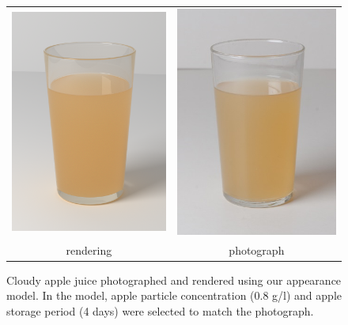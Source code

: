 \begin{figure}
\begin{tabular}{@{}c@{}c@{}}
	 \includegraphics[width=0.5\columnwidth]{figures/teaser_render.png} &
	 \includegraphics[width=0.5\columnwidth]{figures/ref_img.jpg}  \\
	rendering & photograph \\
\end{tabular}
\caption{Cloudy apple juice photographed and rendered using our appearance model. In the model, apple particle concentration (0.8 g/l) and apple storage period (4 days) were selected to match the photograph.} %
\label{fig:juicecomparison}
\end{figure}

